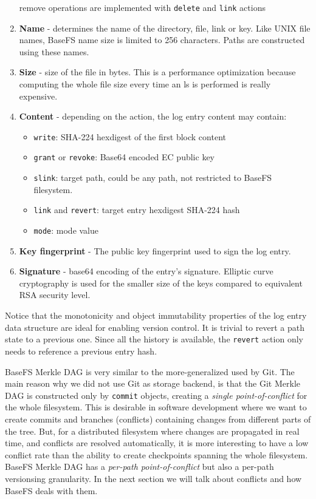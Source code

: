 \documentclass{sig-alternate}
\begin{document}
\begin{enumerate}
remove operations are implemented with \texttt{delete} and \texttt{link} actions
\item \textbf{Name} - determines the name of the directory, file, link or key. Like UNIX file names, BaseFS name size is limited to 256 characters. Paths are constructed using these names.
\item \textbf{Size} - size of the file in bytes. This is a performance optimization because computing the whole file size every time an ls is performed is really expensive.
\item \textbf{Content} - depending on the action, the log entry content may contain:
    \begin{itemize}
    \item \texttt{write}: SHA-224 hexdigest of the first block content
    \item \texttt{grant} or \texttt{revoke}: Base64 encoded EC public key
    \item \texttt{slink}: target path, could be any path, not restricted to BaseFS filesystem.
    \item \texttt{link} and \texttt{revert}: target entry hexdigest SHA-224 hash
    \item \texttt{mode}: mode value
    \end{itemize}
\item \textbf{Key fingerprint} - The public key fingerprint used to sign the log entry.
\item \textbf{Signature} - base64 encoding of the entry's signature. Elliptic curve cryptography is used for the smaller size of the keys compared to equivalent RSA security level.
\end{enumerate}

Notice that the monotonicity and object immutability properties of the log entry data structure are ideal for enabling version control. It is trivial to revert a path state to a previous one. Since all the history is available, the \texttt{revert} action only needs to reference a previous entry hash.

BaseFS Merkle DAG is very similar to the more-generalized used by Git. The main reason why we did not use Git as storage backend, is that the Git Merkle DAG is constructed only by \texttt{commit} objects, creating a \textit{single point-of-conflict} for the whole filesystem. This is desirable in software development where we want to create commits and branches (conflicts) containing changes from different parts of the tree. But, for a distributed filesystem where changes are propagated in real time, and conflicts are resolved automatically, it is more interesting to have a low conflict rate than the ability to create checkpoints spanning the whole filesystem. BaseFS Merkle DAG has a \textit{per-path point-of-conflict} but also a per-path versionsing granularity. In the next section we will talk about conflicts and how BaseFS deals with them.
\end{document}
